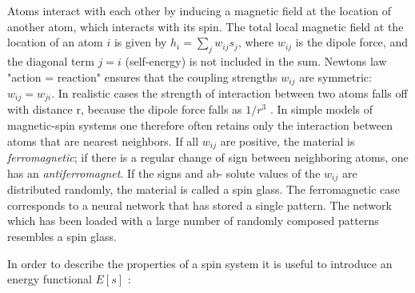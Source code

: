 Atoms interact with each other by inducing a magnetic field at the location of another atom, which interacts with its spin. The total local magnetic field at the location of an atom $i$ is given by $h_i = \sum_{j}w_{ij}s_{j}$, where $w_{ij}$ is the dipole force, and the diagonal term $j = i$ (self-energy) is not included in the sum. Newtons law "action = reaction" ensures that the coupling strengths $w_{ij}$ are symmetric: $w_{ij} = w_{ji}$. In realistic cases the strength of interaction between two atoms falls off with distance r, because the dipole force falls as $1/r^3$ . In simple models of magnetic-spin systems one therefore often retains only the interaction between atoms that are nearest neighbors. If all $w_{ij}$ are positive, the material is \emph{ferromagnetic}; if there is a regular change of sign between neighboring atoms, one has an \emph{antiferromagnet}. If the signs and ab- solute values of the $w_{ij}$ are distributed randomly, the material is called a spin glass. The ferromagnetic case corresponds to a neural network that has stored a single pattern. The network which has been loaded with a large number of randomly composed patterns resembles a spin glass.

In order to describe the properties of a spin system it is useful to introduce
an energy functional $E[s]$ :

